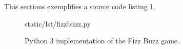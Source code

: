 
This sections exemplifies a source code listing \ref{lst:lst}.

\vspace*{1\baselineskip}

\begin{figure}[!ht]

  {static/lst/fizzbuzz.py}
  \caption{Python 3 implementation of the Fizz Buzz game.}
  \label{lst:lst}
\end{figure}
